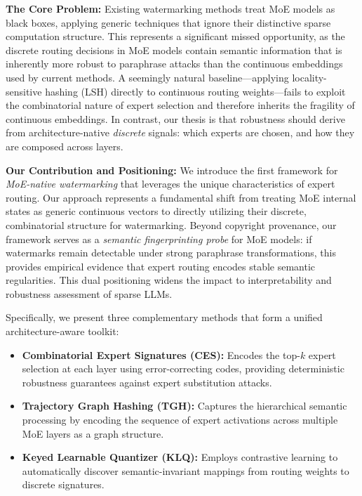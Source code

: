 \textbf{The Core Problem:} Existing watermarking methods treat MoE models as black boxes, applying generic techniques that ignore their distinctive sparse computation structure. This represents a significant missed opportunity, as the discrete routing decisions in MoE models contain semantic information that is inherently more robust to paraphrase attacks than the continuous embeddings used by current methods. A seemingly natural baseline---applying locality-sensitive hashing (LSH) directly to continuous routing weights---fails to exploit the combinatorial nature of expert selection and therefore inherits the fragility of continuous embeddings. In contrast, our thesis is that robustness should derive from architecture-native \emph{discrete} signals: which experts are chosen, and how they are composed across layers.

\textbf{Our Contribution and Positioning:} We introduce the first framework for \textit{MoE-native watermarking} that leverages the unique characteristics of expert routing. Our approach represents a fundamental shift from treating MoE internal states as generic continuous vectors to directly utilizing their discrete, combinatorial structure for watermarking. Beyond copyright provenance, our framework serves as a \emph{semantic fingerprinting probe} for MoE models: if watermarks remain detectable under strong paraphrase transformations, this provides empirical evidence that expert routing encodes stable semantic regularities. This dual positioning widens the impact to interpretability and robustness assessment of sparse LLMs.

Specifically, we present three complementary methods that form a unified architecture-aware toolkit:

\begin{itemize}
\item \textbf{Combinatorial Expert Signatures (CES):} Encodes the top-$k$ expert selection at each layer using error-correcting codes, providing deterministic robustness guarantees against expert substitution attacks.
\item \textbf{Trajectory Graph Hashing (TGH):} Captures the hierarchical semantic processing by encoding the sequence of expert activations across multiple MoE layers as a graph structure.
\item \textbf{Keyed Learnable Quantizer (KLQ):} Employs contrastive learning to automatically discover semantic-invariant mappings from routing weights to discrete signatures.
\end{itemize}

